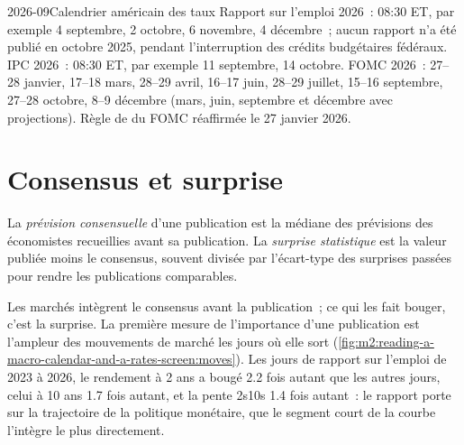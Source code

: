 \begin{dated}{2026-09}{Calendrier américain des taux}\label{dat:m2:reading-a-macro-calendar-and-a-rates-screen:calendar}
Rapport sur l'emploi 2026~: 08:30 ET, par exemple 4 septembre, 2 octobre, 6 novembre, 4 décembre~; aucun
rapport n'a été publié en octobre 2025, pendant l'interruption des crédits budgétaires fédéraux. IPC 2026~:
08:30 ET, par exemple 11 septembre, 14 octobre. FOMC 2026~: 27--28 janvier, 17--18 mars, 28--29
avril, 16--17 juin, 28--29 juillet, 15--16 septembre, 27--28 octobre, 8--9 décembre (mars,
juin, septembre et décembre avec projections). Règle de  du FOMC réaffirmée le 27 janvier 2026.
\end{dated}

\section{Consensus et surprise}

\begin{definition}\label{def:m2:reading-a-macro-calendar-and-a-rates-screen:surprise}
La \emph{prévision consensuelle} d'une publication est la médiane des
prévisions des économistes recueillies avant sa publication. La \emph{surprise statistique}
est la valeur publiée moins le consensus, souvent divisée par l'écart-type des
surprises passées pour rendre les publications comparables.
\end{definition}

Les marchés intègrent le consensus avant la publication~; ce qui les fait bouger, c'est la surprise. La
première mesure de l'importance d'une publication est l'ampleur des mouvements de marché les jours
où elle sort (\cref{fig:m2:reading-a-macro-calendar-and-a-rates-screen:moves}). Les jours de rapport sur l'emploi
de 2023 à 2026, le rendement à 2 ans a bougé 2.2 fois autant que les autres jours, celui à 10 ans 1.7
fois autant, et la pente 2s10s 1.4 fois autant~: le rapport porte sur la trajectoire de la politique monétaire, que
le segment court de la courbe l'intègre le plus directement.

